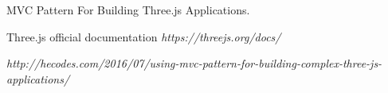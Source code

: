 \begin{thebibliography}{9}
MVC Pattern For Building Three.js Applications. 

Three.js official documentation 
\textit{https://threejs.org/docs/}

\textit{http://hecodes.com/2016/07/using-mvc-pattern-for-building-complex-three-js-applications/}
\end{thebibliography}

